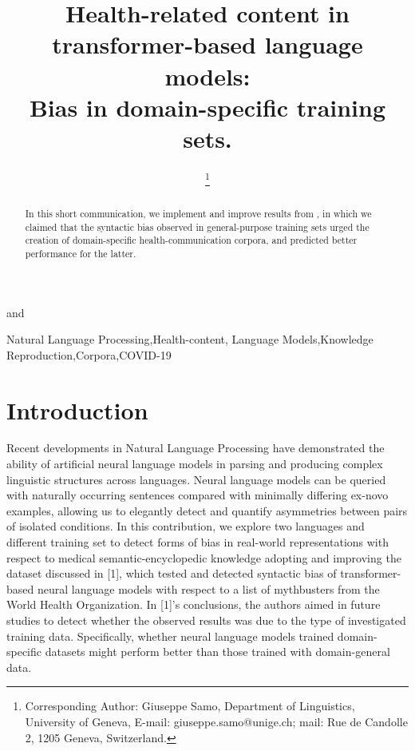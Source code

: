 \documentclass{IOS-Book-Article}
\def\hb{\hbox to 11.5 cm{}}
\begin{document}
\pagestyle{headings}
\def\thepage{}
\begin{frontmatter}              %


\title{Health-related content in transformer-based language models:\\ Bias in domain-specific training sets.}

\markboth{}{January 2023\hb}


\author[A]{ %
}
and
\author[B]{ 
\thanks{Corresponding Author: Giuseppe Samo, Department of Linguistics, University of Geneva, E-mail: giuseppe.samo@unige.ch; mail: Rue de Candolle 2, 1205 Geneva, Switzerland. }}
\address[A]{University of Cambridge}
\address[B]{University of Geneva}

\begin{abstract}
In this short communication, we implement and improve results from \cite{r1}, in which we claimed that the syntactic bias observed in general-purpose training sets urged the creation of domain-specific health-communication corpora, and predicted better performance for the latter. 
\end{abstract}

\begin{keyword}
Natural Language Processing\sep Health-content\sep 
Language Models\sep Knowledge Reproduction\sep Corpora\sep COVID-19
\end{keyword}
\end{frontmatter}
\markboth{January 2023\hb}{January 2023\hb}

\section{Introduction}

Recent developments in Natural Language Processing have
demonstrated the ability of artificial neural language models in parsing and producing complex linguistic structures across languages. Neural language models can be queried with naturally occurring sentences compared with minimally differing ex-novo examples, allowing us to elegantly detect and quantify asymmetries between pairs of isolated conditions.
In this contribution, we explore two languages and different training set to detect forms of bias in real-world representations with respect to medical semantic-encyclopedic knowledge adopting and improving the dataset discussed in [1], which tested and detected syntactic bias of transformer-based neural language models with respect to a list of mythbusters from the World Health Organization. %
In [1]'s conclusions, the authors aimed in future studies to detect whether the observed results was due to the type of investigated training data. Specifically, whether neural language models trained domain-specific datasets might perform better than those trained with domain-general data.
\end{document}

